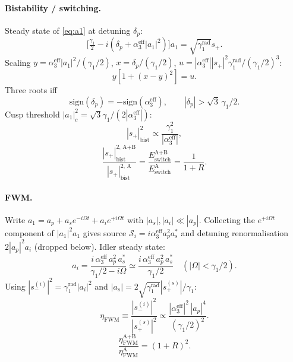 \documentclass[11pt,a4paper]{article}
\begin{document}
\paragraph{Bistability / switching.} Steady state of \eqref{eq:a1} at detuning $\delta_p$:
\begin{equation}
  \bigl[\tfrac{\gamma_1}{2}-i(\delta_p+\alpha_3^\text{eff}|a_1|^2)\bigr]a_1=\sqrt{\gamma_1^\text{rad}}s_+.
  \label{eq:bist-SS}
\end{equation}
Scaling $y=\alpha_3^\text{eff}|a_1|^2/(\gamma_1/2)$, $x=\delta_p/(\gamma_1/2)$, $u=|\alpha_3^\text{eff}||s_+|^2\gamma_1^\text{rad}/(\gamma_1/2)^3$:
\begin{equation}
  y[1+(x-y)^2]=u.
\end{equation}
Three roots iff
\begin{equation}
  \mathrm{sign}(\delta_p)=-\mathrm{sign}(\alpha_3^\text{eff}),
  \qquad |\delta_p|>\sqrt{3}\,\gamma_1/2.
\end{equation}
Cusp threshold $|a_1|^2_c=\sqrt{3}\gamma_1/(2|\alpha_3^\text{eff}|)$:
\begin{equation}
  |s_+|^{2}_\text{bist}\propto\frac{\gamma_1^{2}}{|\alpha_3^\text{eff}|},
\end{equation}
\begin{equation}
  \boxed{\;\frac{|s_+|^{2,\,\text{A+B}}_\text{bist}}{|s_+|^{2,\,\text{A}}_\text{bist}}
        =\frac{E_\text{switch}^{\text{A+B}}}{E_\text{switch}^{\text{A}}}=\frac{1}{1+R}.\;}
\end{equation}

\paragraph{FWM.} Write $a_1=a_p+a_s e^{-i\Omega t}+a_i e^{+i\Omega t}$ with $|a_s|,|a_i|\ll|a_p|$. Collecting the $e^{+i\Omega t}$ component of $|a_1|^2 a_1$ gives source $\mathcal{S}_i=i\alpha_3^\text{eff}a_p^2 a_s^*$ and detuning renormalisation $2|a_p|^2 a_i$ (dropped below). Idler steady state:
\begin{equation}
  a_i=\frac{i\,\alpha_3^\text{eff}\,a_p^{2}\,a_s^{*}}{\gamma_1/2-i\Omega}
   \simeq\frac{i\,\alpha_3^\text{eff}\,a_p^{2}\,a_s^{*}}{\gamma_1/2}\quad(|\Omega|<\gamma_1/2).
\end{equation}
Using $|s_-^{(i)}|^2=\gamma_1^\text{rad}|a_i|^2$ and $|a_s|=2\sqrt{\gamma_1^\text{rad}}|s_+^{(s)}|/\gamma_1$:
\begin{equation}
  \eta_\text{FWM}\equiv\frac{|s_-^{(i)}|^{2}}{|s_+^{(s)}|^{2}}\propto
       \frac{|\alpha_3^\text{eff}|^{2}\,|a_p|^{4}}{(\gamma_1/2)^{2}}.
\end{equation}
\begin{equation}
  \boxed{\;\frac{\eta_\text{FWM}^{\text{A+B}}}{\eta_\text{FWM}^{\text{A}}}=(1+R)^{2}.\;}
\end{equation}
\end{document}
